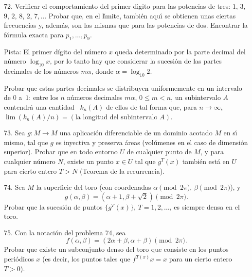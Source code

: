 \begin{problem}{72.}
	Verificar el comportamiento del primer d\'{\i}gito para las potencias de tres: $1$, $3$, $9$, $2$, $8$, $2$, $7, \dotsc$ Probar que, en el l\'{\i}mite, tambi\'en aqu\'{\i} se obtienen unas ciertas frecuencias y, adem\'as, son las mismas que para las potencias de dos.
	Encontrar la f\'ormula exacta para $p_1, \dotsc, p_9$.
	\begin{note}{Pista:}
		El primer d\'igito del n\'umero $x$ queda determinado por la parte decimal del n\'umero  $\log_{10} x$, por lo tanto hay que considerar la sucesi\'on de las partes decimales de los n\'umeros $m \alpha$, donde $\alpha=\log_{10} 2$.
	\end{note}

	Probar que estas partes decimales se distribuyen uniformemente en un intervalo de $0$ a~$1$: entre los $n$ n\'umeros decimales $m \alpha$, $0 \leqslant m<n$,
	un subintervalo $A$ contendr\'a una cantidad ~$k_n (A)$ de ellos de tal forma que, para $n \to \infty$, $\lim (k_n (A)/n)=(\text{la longitud del subintervalo }A)$.
\end{problem}

\begin{problem}{73.}
	 Sea $g\colon M\to M$ una aplicaci\'on diferenciable de un dominio acotado $M$ en s\'{\i} mismo, tal que $g$ es inyectiva y preserva \'areas (vo\-l\'u\-me\-nes en el caso de dimensi\'on superior).
Probar que en todo entorno $U$ de cualquier punto de $M$, y para cualquier n\'umero $N$, existe un punto $x\in U$ tal que $g^T(x)$ tambi\'en est\'a en $U$ para cierto entero $T>N$ (Teorema de la recurrencia).
	\end{problem}

\begin{problem}{74.}
	Sea $M$ la superficie del toro (con coordenadas $\alpha \pmod{2\pi}$, $\beta\pmod{2\pi}$), y
	\begin{equation*}
		g(\alpha, \beta)=(\alpha+1, \beta+ \sqrt{2}) \pmod{2\pi}.
	\end{equation*}
	Probar que la sucesi\'on de puntos $\{g^T (x)\}$, $T=1, 2, \dotsc$, es siempre densa en el toro.
\end{problem}

\begin{problem}{75.}
	Con la notaci\'on del problema  74, sea
	\begin{equation*}
		f(\alpha, \beta)=(2\alpha+\beta,\alpha+\beta) \pmod{2\pi}.
	\end{equation*}
	Probar que existe un subconjunto denso del toro que consiste en los puntos peri\'odicos $x$ (es decir, los puntos tales que
	$f^{T (x)} x=x$ para un cierto entero $T>0$).
\end{problem}


